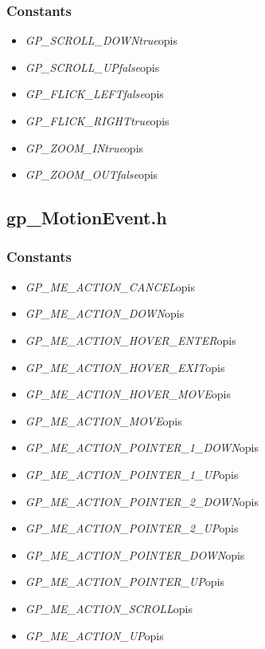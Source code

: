\subsubsection{Constants}
\begin{itemize}
\item \textit{GP_SCROLL_DOWN\quad true}\qquad opis
\item \textit{GP_SCROLL_UP\quad false}\qquad opis
\item \textit{GP_FLICK_LEFT\quad false}\qquad opis
\item \textit{GP_FLICK_RIGHT\quad true}\qquad opis
\item \textit{GP_ZOOM_IN\quad true}\qquad opis
\item \textit{GP_ZOOM_OUT\quad false}\qquad opis
\end{itemize}

\subsection{gp_MotionEvent.h}
\subsubsection{Constants}
\begin{itemize}
\item \textit{GP_ME_ACTION_CANCEL}\qquad opis
\item \textit{GP_ME_ACTION_DOWN}\qquad opis
\item \textit{GP_ME_ACTION_HOVER_ENTER}\qquad opis
\item \textit{GP_ME_ACTION_HOVER_EXIT}\qquad opis
\item \textit{GP_ME_ACTION_HOVER_MOVE}\qquad opis
\item \textit{GP_ME_ACTION_MOVE}\qquad opis
\item \textit{GP_ME_ACTION_POINTER_1_DOWN}\qquad opis
\item \textit{GP_ME_ACTION_POINTER_1_UP}\qquad opis
\item \textit{GP_ME_ACTION_POINTER_2_DOWN}\qquad opis
\item \textit{GP_ME_ACTION_POINTER_2_UP}\qquad opis
\item \textit{GP_ME_ACTION_POINTER_DOWN}\qquad opis
\item \textit{GP_ME_ACTION_POINTER_UP}\qquad opis
\item \textit{GP_ME_ACTION_SCROLL}\qquad opis
\item \textit{GP_ME_ACTION_UP}\qquad opis
\end{itemize}

